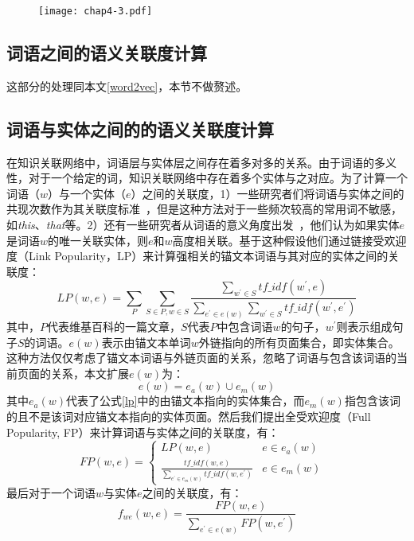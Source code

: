\begin{figure}[!ht]
    \centerline{\texttt{[image: chap4-3.pdf]}}
    \label{chap4-3}
\end{figure}

\subsection{词语之间的语义关联度计算}
\label{dbpedia_word2vec}
这部分的处理同本文\ref{word2vec}，本节不做赘述。

\subsection{词语与实体之间的的语义关联度计算}
在知识关联网络中，词语层与实体层之间存在着多对多的关系。由于词语的多义性，对于一个给定的词，知识关联网络中存在着多个实体与之对应。为了计算一个词语（$w$）与一个实体（$e$）之间的关联度，1）一些研究者们将词语与实体之间的共现次数作为其关联度标准~\cite{aaai/Pirro12}，但是这种方法对于一些频次较高的常用词不敏感，如\emph{this}、\emph{that}等。2）还有一些研究者从词语的意义角度出发~\cite{aaai/GongXH18}，他们认为如果实体$e$是词语$w$的唯一关联实体，则$e$和$w$高度相关联。基于这种假设他们通过链接受欢迎度（Link Popularity，LP）来计算强相关的锚文本词语与其对应的实体之间的关联度：
\begin{equation}
    \label{lp}
    LP(w, e) = \sum_{P}^{ }\sum_{S \in P, w \in S}^{ } \frac{\sum_{w^{'} \in S}^{ }tf\_idf(w^{'},e)}
    {\sum_{e^{'} \in e(w)}^{ }\sum_{w^{'} \in S}^{ }tf\_idf(w^{'}, e^{'})}
\end{equation}
\noindent 其中，$P$代表维基百科的一篇文章，$S$代表$P$中包含词语$w$的句子，$w^{'}$则表示组成句子$S$的词语。$e(w)$表示由锚文本单词$w$外链指向的所有页面集合，即实体集合。这种方法仅仅考虑了锚文本词语与外链页面的关系，忽略了词语与包含该词语的当前页面的关系，本文扩展$e(w)$为：
\begin{equation}
    \label{entities-set}
    e(w) = e_{a}(w) \cup e_{m}(w)
\end{equation}
\noindent 其中$e_{a}(w)$代表了公式\ref{lp}中的由锚文本指向的实体集合，而$e_{m}(w)$指包含该词的且不是该词对应锚文本指向的实体页面。然后我们提出全受欢迎度（Full Popularity, FP）来计算词语与实体之间的关联度，有：
\begin{equation}
    \label{fp}
    FP(w,e) = \left\{\begin{matrix}
        LP(w,e) & e \in e_{a}(w) & \\
        \frac{tf\_idf(w,e)}{\sum_{e^{'} \in e_m(w)}^{ }tf\_idf(w,e^{'})} & e \in e_{m}(w) & 
        \end{matrix}\right.
\end{equation}
\noindent 最后对于一个词语$w$与实体$e$之间的关联度，有：
\begin{equation}
    \label{f_we}
    f_{we}(w, e) = \frac{FP(w, e)}{\sum_{e^{'} \in e(w)}^{ }FP(w, e^{'})}
\end{equation}


